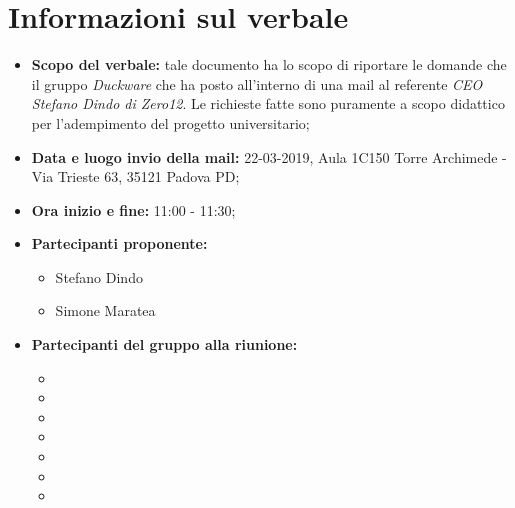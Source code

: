 \clearpage
\section{Informazioni sul verbale}
\begin{itemize}
	\item \textbf {Scopo del verbale:} tale documento ha lo scopo di riportare le domande che il gruppo \emph{Duckware} che ha posto all'interno di una mail al referente \emph{CEO Stefano Dindo di Zero12}. Le richieste fatte sono puramente a scopo didattico per l'adempimento del progetto universitario;
	\item \textbf {Data e luogo invio della mail:} 22-03-2019, Aula 1C150 Torre Archimede - Via Trieste 63, 35121 Padova PD;
	\item \textbf {Ora inizio e fine:} 11:00 - 11:30;
	\item \textbf {Partecipanti proponente:} 
		\begin{itemize}
			\item Stefano Dindo
			\item Simone Maratea
		\end{itemize}
	\item \textbf {Partecipanti del gruppo alla riunione:} 
		 \begin{itemize}
			\item \sonia
			\item \luca
			\item \matteo
			\item \pardeep
			\item \alberto
			\item \alessandro
			\item \andrea
		\end{itemize}
\end{itemize}